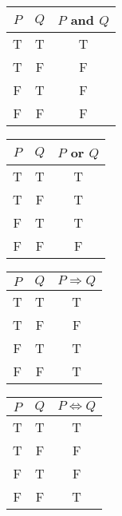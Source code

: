\documentclass[11pt]{article}
\begin{document}
    \begin{tabular}{| c | c | c |} \hline
        $P$ & $Q$ & $P$ and $Q$ \\ \hline
        T   &  T  &      T      \\ \hline 
        T   &  F  &      F      \\ \hline 
        F   &  T  &      F      \\ \hline 
        F   &  F  &      F      \\ \hline 
    \end{tabular} \hspace{0.5em}
    \begin{tabular}{| c | c | c |} \hline
        $P$ & $Q$ & $P$ or $Q$  \\ \hline
        T   &  T  &      T      \\ \hline 
        T   &  F  &      T      \\ \hline 
        F   &  T  &      T      \\ \hline 
        F   &  F  &      F      \\ \hline 
    \end{tabular} \hspace{0.5em}
    \begin{tabular}{| c | c | c |} \hline
        $P$ & $Q$ & $P \Rightarrow Q$ \\ \hline
        T   &  T  &      T            \\ \hline 
        T   &  F  &      F            \\ \hline 
        F   &  T  &      T            \\ \hline 
        F   &  F  &      T            \\ \hline 
    \end{tabular} \hspace{0.5em}
    \begin{tabular}{| c | c | c |} \hline
        $P$ & $Q$ & $P \Leftrightarrow Q$ \\ \hline
        T   &  T  &      T                \\ \hline 
        T   &  F  &      F                \\ \hline 
        F   &  T  &      F                \\ \hline 
        F   &  F  &      T                \\ \hline 
    \end{tabular}

    \vspace{0.5em}
\end{document}

